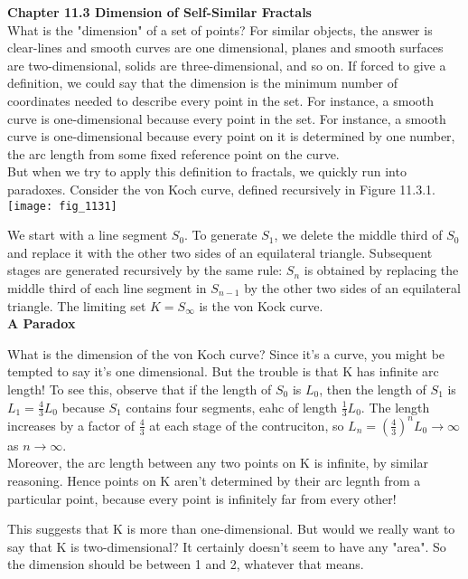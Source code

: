 \documentclass{article}
\newcommand\tab[1][1cm]{\hspace*{#1}}
\begin{document}
\textbf {Chapter 11.3 Dimension of Self-Similar Fractals} \\
What is the "dimension" of a set of points? For similar objects, the answer is clear-lines and smooth curves are one dimensional, planes and smooth surfaces are two-dimensional, solids are three-dimensional, and so on. If forced to give a definition, we could say that the dimension is the minimum number of coordinates needed to describe every point in the set. For instance, a smooth curve is one-dimensional because every point in the set. For instance, a smooth curve is one-dimensional because every point on it is determined by one number, the arc length from some fixed reference point on the curve. \\ \tab
But when we try to apply this definition to fractals, we quickly run into paradoxes. Consider the von Koch curve, defined recursively in Figure 11.3.1. \\

\texttt{[image: fig\_1131]}

We start with a line segment $S_{0}$. To generate $S_{1}$, we delete the middle third of $S_{0}$ and replace it with the other two sides of an equilateral triangle. Subsequent stages are generated recursively by the same rule: $S_{n}$ is obtained by replacing the middle third of each line segment in $S_{n-1}$ by the other two sides of an equilateral triangle. The limiting set $K=S_{\infty}$ is the von Kock curve. \\ 

\textbf {A Paradox} \\ \tab

What is the dimension of the von Koch curve? Since it's a curve, you might be tempted to say it's one dimensional. But the trouble is that K has infinite arc length! To see this, observe that if the length of $S_{0}$ is $L_{0}$, then the length of $S_{1}$ is $L_{1}=\frac{4}{3}L_{0}$ because $S_{1}$ contains four segments, eahc of length $\frac{1}{3}L_{0}$. The length increases by a factor of $\frac{4}{3}$ at each stage of the contruciton, so $L_{n}=(\frac{4}{3})^{n}L_{0} \to \infty$ as $n \to \infty$. \\ \tab 
Moreover, the arc length between any two points on K is infinite, by similar reasoning. Hence points on K aren't determined by their arc legnth from a particular point, because every point is infinitely far from every other! \\ \tab

This suggests that K is more than one-dimensional. But would we really want to say that K is two-dimensional? It certainly doesn't seem to have any "area". So the dimension should be between 1 and 2, whatever that means. \\ \tab
\end{document}

